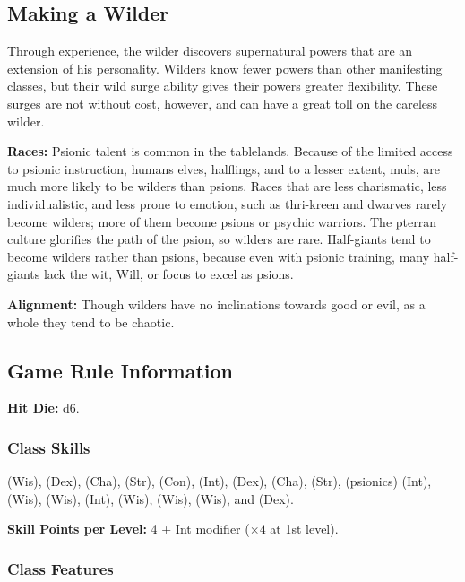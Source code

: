 \subsection{Making a Wilder}

Through experience, the wilder discovers supernatural powers that are an extension of his personality. Wilders know fewer powers than other manifesting classes, but their wild surge ability gives their powers greater flexibility. These surges are not without cost, however, and can have a great toll on the careless wilder.

\textbf{Races:} Psionic talent is common in the tablelands. Because of the limited access to psionic instruction, humans elves, halflings, and to a lesser extent, muls, are much more likely to be wilders than psions. Races that are less charismatic, less individualistic, and less prone to emotion, such as thri-kreen and dwarves rarely become wilders; more of them become psions or psychic warriors. The pterran culture glorifies the path of the psion, so wilders are rare. Half-giants tend to become wilders rather than psions, because even with psionic training, many half-giants lack the wit, Will, or focus to excel as psions.

\textbf{Alignment:} Though wilders have no inclinations towards good or evil, as a whole they tend to be chaotic.

\subsection{Game Rule Information}

\textbf{Hit Die:} d6.

\subsubsection{Class Skills}
 (Wis),  (Dex),  (Cha),  (Str),  (Con),  (Int),  (Dex),  (Cha),  (Str),  (psionics) (Int),  (Wis),  (Wis),  (Int),  (Wis),  (Wis),  (Wis), and  (Dex).

\textbf{Skill Points per Level:} 4 + Int modifier ($\times 4$ at 1st level).

\subsubsection{Class Features}

